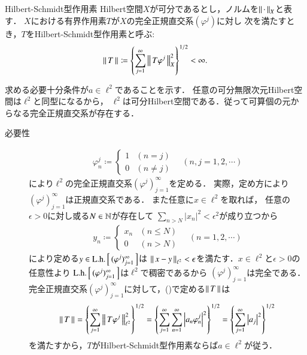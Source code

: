 \begin{prf}
\begin{description}
				\begin{itembox}[l]{Hilbert-Schmidt型作用素}
					Hilbert空間$X$が可分であるとし，ノルムを$\left\|\, \cdot\, \right\|_{X}$と表す．
					$X$における有界作用素$T$が$X$の完全正規直交系$(\varphi^j)$に対し
					次を満たすとき，$T$をHilbert-Schmidt型作用素と呼ぶ:
					\begin{align}
						\left\|\, T\, \right\|_{} \coloneqq \left\{ \sum_{j=1}^{\infty} \left\|\, T \varphi^j\, \right\|_{X}^2 \right\}^{1/2} < \infty.
						\label{eq:report_7_1}
					\end{align}
				\end{itembox}
				
				求める必要十分条件が$a \in \ell^2$であることを示す．
				任意の可分無限次元Hilbert空間は$\ell^2$と同型になるから，
				$\ell^2$は可分Hilbert空間である．従って可算個の元からなる完全正規直交系が存在する．
				\begin{description}
					\item[必要性]
						\begin{align}
							\varphi^j_n \coloneqq 
							\begin{cases}
								1 & (n = j) \\
								0 & (n \neq j)
							\end{cases}
							\quad (n,j=1,2,\cdots)
						\end{align}
						により$\ell^2$の完全正規直交系$(\varphi^j)_{j=1}^{\infty}$を定める．
						実際，定め方により$(\varphi^j)_{j=1}^{\infty}$は正規直交系である．
						また任意に$x \in \ell^2$を取れば，
						任意の$\epsilon > 0$に対し或る$N \in \mathbb{N}$が存在して
						$\sum_{n>N} |x_n|^2 < \epsilon^2$が成り立つから
						\begin{align}
							y_n \coloneqq 
							\begin{cases}
								x_n & (n \leq N) \\
								0 & (n > N)
							\end{cases}
							\quad (n=1,2,\cdots)
						\end{align}
						により定める$y \in \mathrm{L.h.}\left[\, (\varphi^j)_{j=1}^{\infty}\, \right]$は
						$\left\|\, x - y\, \right\|_{\ell^2} < \epsilon$を満たす．$x \in \ell^2$と$\epsilon > 0$の任意性より
						$\mathrm{L.h.}\left[\, (\varphi^j)_{j=1}^{\infty}\, \right]$は$\ell^2$で稠密であるから
						$(\varphi^j)_{j=1}^{\infty}$は完全である．
						完全正規直交系$(\varphi^j)_{j=1}^{\infty}$に対して，()で定める$\left\|\, T\, \right\|_{}$は
						\begin{align}
							\left\|\, T\, \right\|_{}
							= \left\{ \sum_{j=1}^{\infty} \left\|\, T \varphi^j\, \right\|_{\ell^2}^2 \right\}^{1/2}
							= \left\{ \sum_{j=1}^{\infty} \sum_{n=1}^{\infty} \left| a_n \varphi^j_n \right|^2 \right\}^{1/2}
							= \left\{ \sum_{j=1}^{\infty} \left| a_j \right|^2 \right\}^{1/2}
							\label{eq:report_7_2}
						\end{align}
						を満たすから，$T$がHilbert-Schmidt型作用素ならば$a \in \ell^2$が従う．
						

\end{description}
\end{description}
\end{prf}
